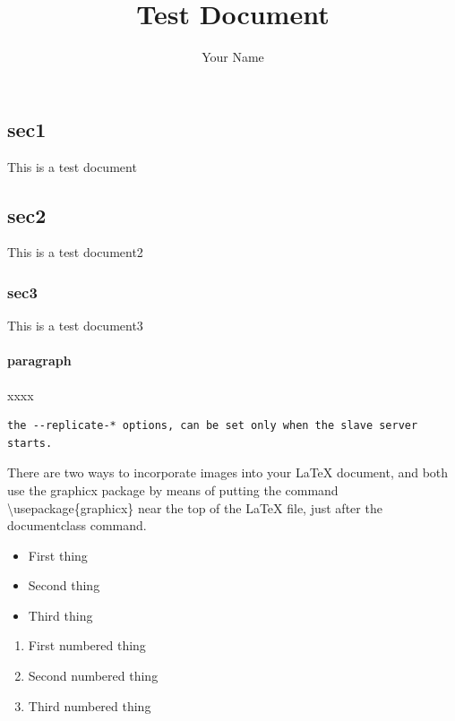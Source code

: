 \documentclass{ctexart}
\author{Your Name}
\title{Test Document}
\begin{document}
\begin{CJK*}{GBK}{song}


\maketitle

\section{sec1}
This is a test document
\subsection{sec2}
This is a test document2
\subsubsection{sec3}
This is a test document3
\paragraph{paragraph}
xxxx


\begin{Sbox}
\begin{minipage}{\textwidth}
\begin{verbatim}
the --replicate-* options, can be set only when the slave server starts.
\end{verbatim}
\end{minipage}
\end{Sbox}
\fbox{\TheSbox}

\parbox{17em}{There are two ways to incorporate images into your LaTeX document, and both use the graphicx package by means of putting the command \textbackslash usepackage\{graphicx\} near the top of the LaTeX file, just after the documentclass command.}

\begin{itemize}
\item First thing
\item Second thing
\item Third thing
\end{itemize}

\begin{enumerate}
\item First numbered thing
\item Second numbered thing
\item Third numbered thing
\end{enumerate}


\end{CJK*}
\end{document}
